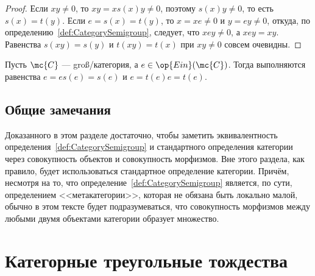 \documentclass[
	extrafontsizes,
	11pt,
	hyphens,
]{memoir}
\begin{document}
\begin{proof}

Если \(xy \neq 0\), то \(xy = x s(x) y \neq 0\), поэтому \(s(x) y \neq 0\), то есть \(s(x) = t(y)\).
Если \(e = s(x) = t(y)\), то \(x = xe \neq 0\) и \(y = ey \neq 0\), откуда, по определению~\ref{def:CategorySemigroup}, следует, что \(xey \neq 0\), а \(xey = xy\).
Равенства \(s(xy) = s(y)\) и \(t(xy) = t(x)\) при \(xy \neq 0\) совсем очевидны.
\end{proof}

\begin{observation}
Пусть \(\mc{C}\) --- groß\-/категория, а \(e \in \op{Ein}(\mc{C})\). Тогда выполняются равенства \(e = e s(e) = s(e)\) и \(e = t(e) e = t(e)\).
\end{observation}

\subsection{Общие замечания}

Доказанного в этом разделе достаточно, чтобы заметить эквивалентность определения~\ref{def:CategorySemigroup} и стандартного определения категории через совокупность объектов и совокупность морфизмов.
Вне этого раздела, как правило, будет использоваться стандартное определение категории.
Причём, несмотря на то, что определение~\ref{def:CategorySemigroup} является, по сути, определением <<метакатегории>>, которая не обязана быть локально малой, обычно в этом тексте будет подразумеваться, что совокупность морфизмов между любыми двумя объектами категории образует множество.


\section{Категорные треугольные тождества}
\end{document}
